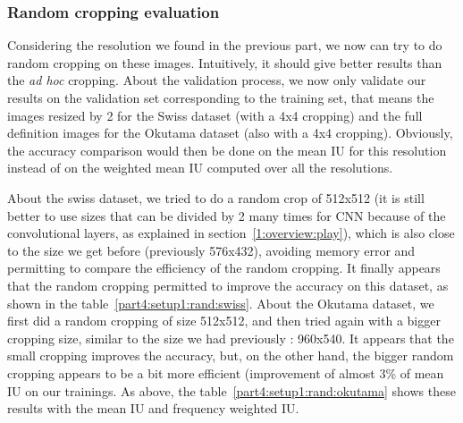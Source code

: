 \subsubsection{Random cropping evaluation}
Considering the resolution we found in the previous part, we now can try to do random cropping on these images. Intuitively, it should give better results than the \textit{ad hoc} cropping. About the validation process, we now only validate our results on the validation set corresponding to the training set, that means the images resized by 2 for the Swiss dataset (with a 4x4 cropping) and the full definition images for the Okutama dataset (also with a 4x4 cropping). Obviously, the accuracy comparison would then be done on the mean IU for this resolution instead of on the weighted mean IU computed over all the resolutions.

About the swiss dataset, we tried to do a random crop of 512x512 (it is still better to use sizes that can be divided by 2 many times for CNN because of the convolutional layers, as explained in section~\ref{1:overview:play}), which is also close to the size we get before (previously 576x432), avoiding memory error and permitting to compare the efficiency of the random cropping. It finally appears that the random cropping permitted to improve the accuracy on this dataset, as shown in the table~\ref{part4:setup1:rand:swiss}. About the Okutama dataset, we first did a random cropping of size 512x512, and then tried again with a bigger cropping size, similar to the size we had previously : 960x540. It appears that the small cropping improves the accuracy, but, on the other hand, the bigger random cropping appears to be a bit more efficient (improvement of almost 3\% of mean IU on our trainings. As above, the table~\ref{part4:setup1:rand:okutama} shows these results with the mean IU and frequency weighted IU.

